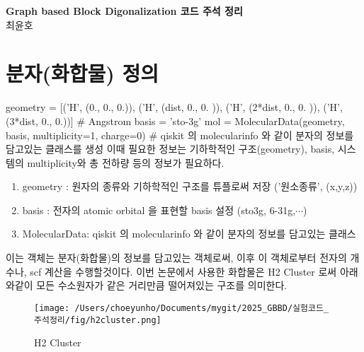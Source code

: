 \documentclass[11pt]{article}
\begin{document}
\begin{center}
  {\LARGE \bfseries Graph based Block Digonalization 코드 주석 정리} \\[10pt]
  {\large 최윤호}
\end{center}

\section{분자(화합물) 정의}
\begin{CodeBox}[title={Example: Python snippet}]
geometry = [('H', (0., 0., 0.)),
            ('H', (dist, 0., 0. )),
            ('H', (2*dist, 0., 0. )),
            ('H', (3*dist, 0., 0.))]  # Angstrom
basis = 'sto-3g'
mol = MolecularData(geometry, basis, multiplicity=1, charge=0)
# qiskit 의 molecularinfo 와 같이 분자의 정보를 담고있는 클래스를 생성 이때 필요한 정보는 기하학적인 구조(geometry), basis, 시스템의 multiplicity와 총 전하량 등의 정보가 필요하다. 
\end{CodeBox}

\begin{enumerate}[label=\textbf{*}, leftmargin=*]
  \item geometry : 원자의 종류와 기하학적인 구조를 튜플로써 저장 ('원소종류', (x,y,z))
  \item basis : 전자의 atomic orbital 을 표현할 basis 설정 (sto3g, 6-31g,$\cdots$)
  \item MolecularData: qiskit 의 molecularinfo 와 같이 분자의 정보를 담고있는 클래스
\end{enumerate}
이는 객체는 분자(화합물)의 정보를 담고있는 객체로써, 이후 이 객체로부터 전자의 개수나, scf 계산을 수행할것이다. 
이번 논문에서 사용한 화합물은 H2 Cluster 로써 아래와같이 모든 수소원자가 같은 거리만큼 떨어져있는 구조를 의미한다. 
\begin{figure}[h]
    \centering
    \texttt{[image: /Users/choeyunho/Documents/mygit/2025\_GBBD/실험코드\_주석정리/fig/h2cluster.png]}
    \caption{H2 Cluster}
    \label{fig:my_image}
\end{figure}
\end{document}
